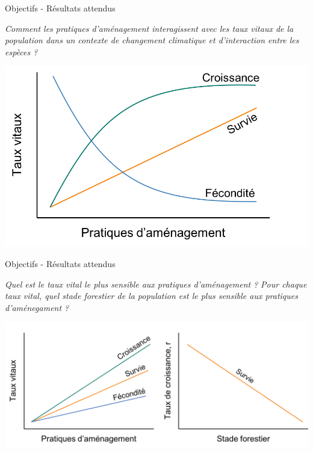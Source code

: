 \documentclass[11pt, compress, aspectratio=1610]{beamer}
\begin{document}
\begin{frame}{Objectifs - Résultats attendus}
\protect\hypertarget{objectifs---ruxe9sultats-attendus-3}{}

\centering

\emph{Comment les pratiques d’aménagement interagissent avec les taux
vitaux de la population dans un contexte de changement climatique et
d’interaction entre les espèces ?}

\vspace*{10mm}
\centering

\includegraphics[scale=0.45]{figures/output_chap3a.png}

\par

\end{frame}

\begin{frame}{Objectifs - Résultats attendus}
\protect\hypertarget{objectifs---ruxe9sultats-attendus-4}{}

\centering

\emph{Quel est le taux vital le plus sensible aux pratiques
d’aménagement ?} \newline \emph{Pour chaque taux vital, quel stade
forestier de la population est le plus sensible aux pratiques
d’aménegament ?}

\vspace*{10mm}
\centering

\includegraphics[scale=0.45]{figures/output_chap3b.png}

\par

\end{frame}
\end{document}
